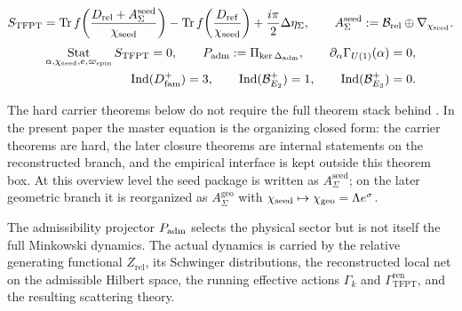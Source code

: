 \begin{tcolorbox}[colback=tfptblue!3, colframe=tfptblue, breakable,
    title={TFPT master equation and closed indices}, colbacktitle=tfptblue]
\begin{equation}
\label{eq:tfpt-master}
\begin{aligned}
S_{\mathrm{TFPT}}
=
\operatorname{Tr}f\!\left(\frac{D_{\mathrm{rel}}+A_{\Sigma}^{\mathrm{seed}}}{\chi_{\mathrm{seed}}}\right)
-
\operatorname{Tr}f\!\left(\frac{D_{\mathrm{ref}}}{\chi_{\mathrm{seed}}}\right)
+\frac{i\pi}{2}\Delta\eta_\Sigma,
\qquad
A_{\Sigma}^{\mathrm{seed}}:=\mathcal B_{\mathrm{rel}}\oplus\nabla_{\chi_{\mathrm{seed}}}.
\end{aligned}
\end{equation}
\begin{equation}
\label{eq:tfpt-selectors}
\begin{aligned}
\operatorname*{Stat}_{\alpha,\chi_{\mathrm{seed}},e,\varpi_{\mathrm{spin}}}S_{\mathrm{TFPT}}=0,
\qquad
P_{\mathrm{adm}}:=\Pi_{\ker\Delta_{\mathrm{adm}}},
\qquad
\partial_\alpha\Gamma_{U(1)}(\alpha)=0,
\\
\operatorname{Ind}(D^+_{\mathrm{fam}})=3,
\qquad
\operatorname{Ind}(\mathcal B^+_{E_2})=1,
\qquad
\operatorname{Ind}(\mathcal B^+_{E_3})=0.
\end{aligned}
\end{equation}
\end{tcolorbox}

The hard carrier theorems below do not require the full theorem stack behind
. In the present paper the master equation is the
organizing closed form: the carrier theorems are hard, the later closure theorems are internal
statements on the reconstructed branch, and the empirical interface is kept outside this theorem
box. At
this overview level the seed package is written as $A_{\Sigma}^{\mathrm{seed}}$; on the later
geometric branch it is reorganized as $A_{\Sigma}^{\mathrm{geo}}$ with
$\chi_{\mathrm{seed}}\mapsto\chi_{\mathrm{geo}}=\Lambda e^\sigma$.

\begin{remark}
\label{rem:selector-versus-dynamics}
The admissibility projector $P_{\mathrm{adm}}$ selects the physical sector but is not itself the full
Minkowski dynamics. The actual dynamics is carried by the relative generating functional
$Z_{\mathrm{rel}}$, its Schwinger distributions, the reconstructed local net on the admissible
Hilbert space, the running effective actions $\Gamma_k$ and
$\Gamma_{\mathrm{TFPT}}^{\mathrm{ren}}$, and the resulting scattering theory.
\end{remark}

